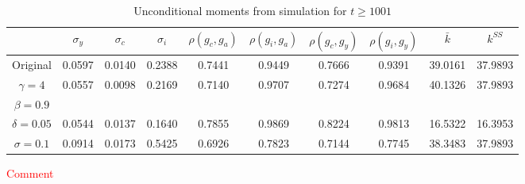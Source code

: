 \documentclass[]{article}
\begin{document}
\begin{table}[!htb]
	\centering
	\begin{tabular}{c|ccccccccc}
	 & $\sigma_y$ & $\sigma_c$ & $\sigma_i$ & $\rho(g_c, g_a)$ & $\rho(g_i, g_a)$ & $\rho(g_c, g_y)$ & $\rho(g_i, g_y)$ & $\bar{k}$ & $k^{SS}$ \\ \hline
	Original & 0.0597 & 0.0140 & 0.2388 & 0.7441 & 0.9449 & 0.7666 & 0.9391 & 39.0161 & 37.9893 \\
	$\gamma = 4$ & 0.0557 & 0.0098 & 0.2169 & 0.7140 & 0.9707 & 0.7274 & 0.9684 & 40.1326 & 37.9893 \\
	$\beta = 0.9$ & & & & & & & & & \\
	$\delta = 0.05$ & 0.0544 & 0.0137 & 0.1640 & 0.7855 & 0.9869 & 0.8224 & 0.9813 & 16.5322 & 16.3953 \\
	$\sigma = 0.1$ & 0.0914 & 0.0173 & 0.5425 & 0.6926 & 0.7823 & 0.7144 & 0.7745 & 38.3483 & 37.9893 \\
	\end{tabular}
	\caption{Unconditional moments from simulation for $t\geq1001$}
\end{table}


\textcolor{red}{Comment}
\end{document}
